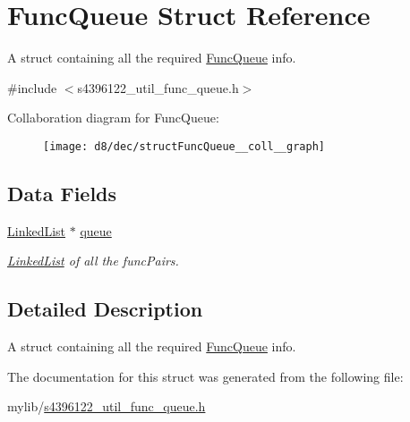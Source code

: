 \hypertarget{structFuncQueue}{}\section{Func\+Queue Struct Reference}
\label{structFuncQueue}


A struct containing all the required \hyperlink{structFuncQueue}{Func\+Queue} info.  




{\ttfamily \#include $<$s4396122\+\_\+util\+\_\+func\+\_\+queue.\+h$>$}



Collaboration diagram for Func\+Queue\+:\nopagebreak
\begin{figure}[H]
\begin{center}
\leavevmode
\texttt{[image: d8/dec/structFuncQueue\_\_coll\_\_graph]}
\end{center}
\end{figure}
\subsection*{Data Fields}
\begin{DoxyCompactItemize}
\item 
\hyperlink{structLinkedList}{Linked\+List} $\ast$ \hyperlink{structFuncQueue_acb6e930c69d3c30707b39f49670bf490}{queue}\hypertarget{structFuncQueue_acb6e930c69d3c30707b39f49670bf490}{}\label{structFuncQueue_acb6e930c69d3c30707b39f49670bf490}

\begin{DoxyCompactList}\small\item\em \hyperlink{structLinkedList}{Linked\+List} of all the func\+Pairs. \end{DoxyCompactList}\end{DoxyCompactItemize}


\subsection{Detailed Description}
A struct containing all the required \hyperlink{structFuncQueue}{Func\+Queue} info. 

The documentation for this struct was generated from the following file\+:\begin{DoxyCompactItemize}
\item 
mylib/\hyperlink{s4396122__util__func__queue_8h}{s4396122\+\_\+util\+\_\+func\+\_\+queue.\+h}\end{DoxyCompactItemize}
